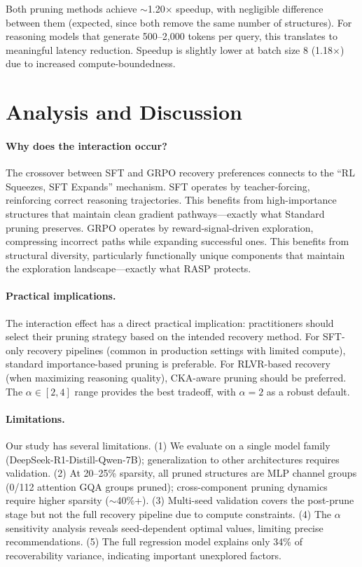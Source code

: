 \documentclass[11pt]{article}
\begin{document}
Both pruning methods achieve ${\sim}$1.20$\times$ speedup, with negligible difference between them (expected, since both remove the same number of structures). For reasoning models that generate 500--2,000 tokens per query, this translates to meaningful latency reduction. Speedup is slightly lower at batch size 8 (1.18$\times$) due to increased compute-boundedness.

\section{Analysis and Discussion}
\label{sec:discussion}

\paragraph{Why does the interaction occur?}
The crossover between SFT and GRPO recovery preferences connects to the ``RL Squeezes, SFT Expands'' mechanism. SFT operates by teacher-forcing, reinforcing correct reasoning trajectories. This benefits from high-importance structures that maintain clean gradient pathways---exactly what Standard pruning preserves. GRPO operates by reward-signal-driven exploration, compressing incorrect paths while expanding successful ones. This benefits from structural diversity, particularly functionally unique components that maintain the exploration landscape---exactly what RASP protects.

\paragraph{Practical implications.}
The interaction effect has a direct practical implication: practitioners should select their pruning strategy based on the intended recovery method. For SFT-only recovery pipelines (common in production settings with limited compute), standard importance-based pruning is preferable. For RLVR-based recovery (when maximizing reasoning quality), CKA-aware pruning should be preferred. The $\alpha \in [2, 4]$ range provides the best tradeoff, with $\alpha{=}2$ as a robust default.

\paragraph{Limitations.}
Our study has several limitations. (1) We evaluate on a single model family (DeepSeek-R1-Distill-Qwen-7B); generalization to other architectures requires validation. (2) At 20--25\% sparsity, all pruned structures are MLP channel groups (0/112 attention GQA groups pruned); cross-component pruning dynamics require higher sparsity (${\sim}$40\%+). (3) Multi-seed validation covers the post-prune stage but not the full recovery pipeline due to compute constraints. (4) The $\alpha$ sensitivity analysis reveals seed-dependent optimal values, limiting precise recommendations. (5) The full regression model explains only 34\% of recoverability variance, indicating important unexplored factors.
\end{document}
